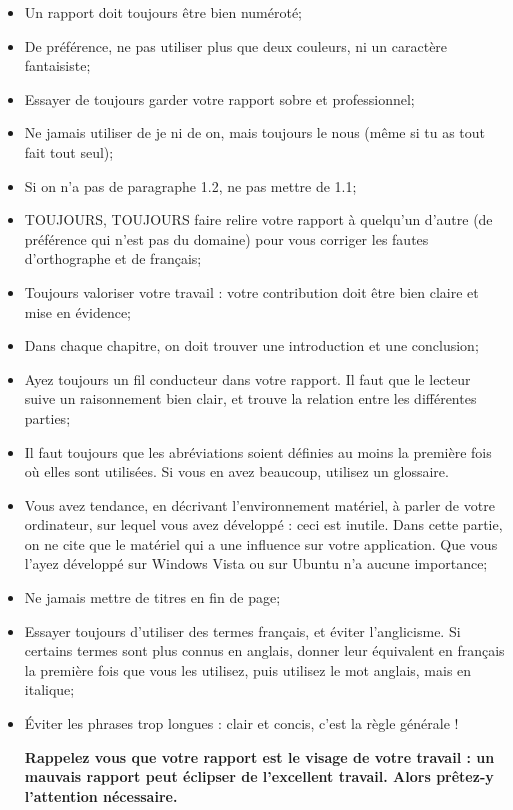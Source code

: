 \begin{itemize}
\item Un rapport doit toujours être bien numéroté;
\item De préférence, ne pas utiliser plus que deux couleurs, ni un caractère fantaisiste; 
\item Essayer de toujours garder votre rapport sobre et professionnel; 
\item Ne jamais utiliser de je ni de on, mais toujours le nous (même si tu as tout fait tout seul); 
\item Si on n'a pas de paragraphe 1.2, ne pas mettre de 1.1;
\item TOUJOURS, TOUJOURS faire relire votre rapport à quelqu'un d'autre (de préférence qui n'est pas du domaine) pour vous corriger les fautes d'orthographe et de français;
\item Toujours valoriser votre travail : votre contribution doit être bien claire et mise en évidence; 
\item Dans chaque chapitre, on doit trouver une introduction et une conclusion;
\item Ayez toujours un fil conducteur dans votre rapport. Il faut que le lecteur suive un raisonnement bien clair, et trouve la relation entre les différentes parties;
\item Il faut toujours que les abréviations soient définies au moins la première fois où elles sont utilisées. Si vous en avez beaucoup, utilisez un glossaire.
\item Vous avez tendance, en décrivant  l'environnement matériel, à parler de votre ordinateur, sur lequel vous avez développé : ceci est inutile. Dans cette partie, on ne cite que le matériel qui a une influence sur votre application. Que vous l'ayez développé sur Windows Vista ou sur Ubuntu n'a aucune importance;
\item Ne jamais mettre de titres en fin de page; 
\item Essayer toujours d'utiliser des termes français, et éviter l'anglicisme. Si certains termes  sont plus connus en  anglais, donner leur équivalent en français la première fois que vous les utilisez, puis utilisez le mot anglais, mais en italique;
\item Éviter les phrases trop longues : clair et concis, c'est la règle générale !\\

\newpage

\textbf{Rappelez vous que votre rapport est le visage de votre travail : un mauvais rapport peut éclipser de l'excellent travail. Alors prêtez-y l'attention nécessaire.}


\end{itemize}
